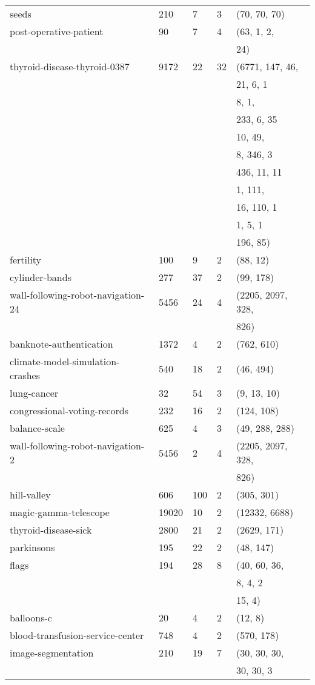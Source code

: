 \documentclass{article}%
\begin{document}
\begin{longtable}{l l l l l}
seeds&210&7&3&(70, 70, 70)\\%
post{-}operative{-}patient&90&7&4&(63, 1, 2,\\%
&&&&24)\\%
thyroid{-}disease{-}thyroid{-}0387&9172&22&32&(6771, 147, 46,\\%
&&&&21, 6, 1\\%
&&&&8, 1, \\%
&&&&233, 6, 35\\%
&&&&10, 49, \\%
&&&&8, 346, 3\\%
&&&&436, 11, 11\\%
&&&&1, 111, \\%
&&&&16, 110, 1\\%
&&&&1, 5, 1\\%
&&&&196, 85)\\%
fertility&100&9&2&(88, 12)\\%
cylinder{-}bands&277&37&2&(99, 178)\\%
wall{-}following{-}robot{-}navigation{-}24&5456&24&4&(2205, 2097, 328,\\%
&&&&826)\\%
banknote{-}authentication&1372&4&2&(762, 610)\\%
climate{-}model{-}simulation{-}crashes&540&18&2&(46, 494)\\%
lung{-}cancer&32&54&3&(9, 13, 10)\\%
congressional{-}voting{-}records&232&16&2&(124, 108)\\%
balance{-}scale&625&4&3&(49, 288, 288)\\%
wall{-}following{-}robot{-}navigation{-}2&5456&2&4&(2205, 2097, 328,\\%
&&&&826)\\%
hill{-}valley&606&100&2&(305, 301)\\%
magic{-}gamma{-}telescope&19020&10&2&(12332, 6688)\\%
thyroid{-}disease{-}sick&2800&21&2&(2629, 171)\\%
parkinsons&195&22&2&(48, 147)\\%
flags&194&28&8&(40, 60, 36,\\%
&&&&8, 4, 2\\%
&&&&15, 4)\\%
balloons{-}c&20&4&2&(12, 8)\\%
blood{-}transfusion{-}service{-}center&748&4&2&(570, 178)\\%
image{-}segmentation&210&19&7&(30, 30, 30,\\%
&&&&30, 30, 3\\%

\end{longtable}
\end{document}
